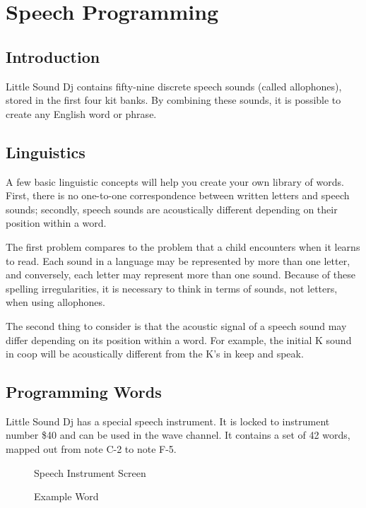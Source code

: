 \chapter{Speech Programming}
\label{speech-chapter}

\section{Introduction}

Little Sound Dj contains fifty-nine discrete speech sounds (called allophones), stored in the first four kit banks. By combining these sounds, it is possible to create any English word or phrase.

\section{Linguistics}

A few basic linguistic concepts will help you create your own library of words. First, there is no one-to-one correspondence between written letters and speech sounds; secondly, speech sounds are acoustically different depending on their position within a word.

The first problem compares to the problem that a child encounters when it learns to read. Each sound in a language may be represented by more than one letter, and conversely, each letter may represent more than one sound. Because of these spelling irregularities, it is necessary to think in terms of sounds, not letters, when using allophones.

The second thing to consider is that the acoustic signal of a speech sound may differ depending on its position within a word. For example, the initial K sound in coop will be acoustically different from the K's in keep and speak.

\section{Programming Words}

Little Sound Dj has a special speech instrument. It is locked to instrument number \$40 and can be used in the wave channel. It contains a set of 42 words, mapped out from note C-2 to note F-5.

\begin{figure}[htpb]
	\begin{center}
	\end{center}
	\caption{Speech Instrument Screen}
	\label{fig:speech}
\end{figure}
\begin{figure}[htpb]
	\begin{center}
	\end{center}
	\caption{Example Word}
	\label{fig:word}
\end{figure}

